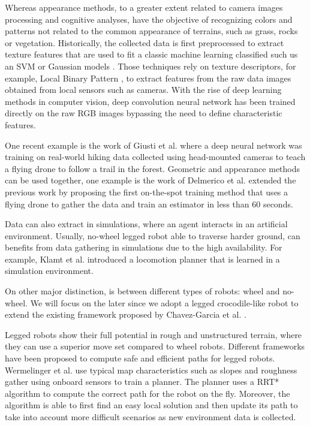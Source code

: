 \documentclass[../document.tex]{subfiles}
\begin{document}
Whereas appearance methods, to a greater extent related to camera images processing and cognitive analyses, have the objective of recognizing colors and patterns not related to the common appearance of terrains, such as grass, rocks or vegetation.  Historically, the collected data is first preprocessed to extract texture features that are used to fit a classic machine learning classified such us an SVM \cite{ugur2010traversability} or Gaussian models \cite{sofman2006improving}. Those techniques rely on texture descriptors, for example, Local Binary Pattern \cite{ojala2002multiresolution}, to extract features from the raw data images obtained from local sensors such as cameras.
With the rise of deep learning methods in computer vision, deep convolution neural network has been trained directly on the raw RGB images bypassing the need to define characteristic features. 

One recent example is the work of Giusti et al. \cite{giusti2015amachine} where a deep neural network was training on real-world hiking data collected using head-mounted cameras to teach a flying drone to follow a trail in the forest. 
Geometric and appearance methods can be used together, one example is the work of Delmerico et al.\cite{delmerico2017onthespot} extended the previous work \cite{delmerico2016active} by proposing the first on-the-spot training method that uses a flying drone to gather the data and train an estimator in less than 60 seconds. 

Data can also extract in simulations, where an agent interacts in an artificial environment. Usually, no-wheel legged robot able to traverse harder ground, can benefits from data gathering in simulations due to the high availability. For example, Klamt et al. \cite{tobias2017anytime} introduced a locomotion planner that is learned in a simulation environment. 

On other major distinction, is between different types of robots: wheel and no-wheel. We will focus on the later since we adopt a legged crocodile-like robot to extend the existing framework proposed by Chavez-Garcia et al. \cite{omar2018traversability}.

Legged robots show their full potential in rough and unstructured terrain, where they can use a superior move set compared to wheel robots. Different frameworks have been proposed to compute safe and efficient paths for legged robots. Wermelinger et al. \cite{wermelinger2016navigation} use typical map characteristics such as slopes and roughness gather using onboard sensors to train a planner. The planner uses a RRT* algorithm to compute the correct path for the robot on the fly. Moreover, the algorithm is able to first find an easy local solution and then update its path to take into account more difficult scenarios as new environment data is collected. 
\end{document}
